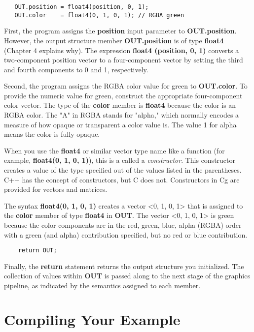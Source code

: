 \documentclass[../main.tex]{subfiles}
\begin{document}
\FloatBarrier
\begin{lstlisting}
   OUT.position = float4(position, 0, 1);
   OUT.color    = float4(0, 1, 0, 1); // RGBA green
\end{lstlisting}
\FloatBarrier

First, the program assigns the \textbf{position} input parameter to \textbf{OUT.position}. However, the output structure member \textbf{OUT.position} is of type \textbf{float4} (Chapter 4 explains why). The expression \textbf{float4 (position, 0, 1)} converts a two-component position vector to a four-component vector by setting the third and fourth components to 0 and 1, respectively.

Second, the program assigns the RGBA color value for green to \textbf{OUT.color}. To provide the numeric value for green, construct the appropriate four-component color vector. The type of the \textbf{color} member is \textbf{float4} because the color is an RGBA color. The "A" in RGBA stands for "alpha," which normally encodes a measure of how opaque or transparent a color value is. The value 1 for alpha means the color is fully opaque.

When you use the \textbf{float4} or similar vector type name like a function (for example, \textbf{float4(0, 1, 0, 1)}), this is a called a \textit{constructor}. This constructor creates a value of the type specified out of the values listed in the parentheses. C++ has the concept of constructors, but C does not. Constructors in Cg are provided for vectors and matrices.

The syntax \textbf{float4(0, 1, 0, 1)} creates a vector <0, 1, 0, 1> that is assigned to the \textbf{color} member of type \textbf{float4} in \textbf{OUT}. The vector <0, 1, 0, 1> is green because the color components are in the red, green, blue, alpha (RGBA) order with a green (and alpha) contribution specified, but no red or blue contribution.

\FloatBarrier
\begin{lstlisting}
    return OUT;
\end{lstlisting}
\FloatBarrier

Finally, the \textbf{return} statement returns the output structure you initialized. The collection of values within \textbf{OUT} is passed along to the next stage of the graphics pipeline, as indicated by the semantics assigned to each member.

\section{Compiling Your Example}
\end{document}
